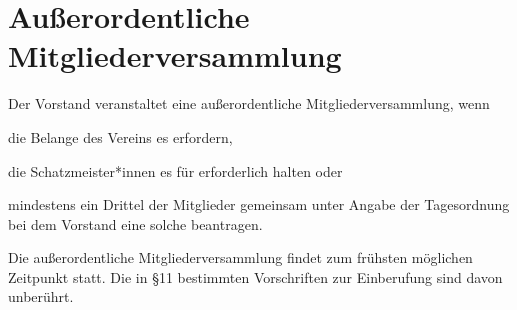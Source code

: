 \section{Außerordentliche Mitgliederversammlung}
	\begin{myEnum}
		\item Der Vorstand veranstaltet eine außerordentliche Mitgliederversammlung, wenn
			\begin{mySubEnum}
				\item die Belange des Vereins es erfordern,
				\item die Schatzmeister*innen es für erforderlich halten oder
				\item mindestens ein Drittel der Mitglieder gemeinsam unter Angabe der Tagesordnung bei dem Vorstand eine solche beantragen.
			\end{mySubEnum}
		\item Die außerordentliche Mitgliederversammlung findet zum frühsten möglichen Zeitpunkt statt. Die in §11 bestimmten Vorschriften zur Einberufung sind davon unberührt.
	\end{myEnum}